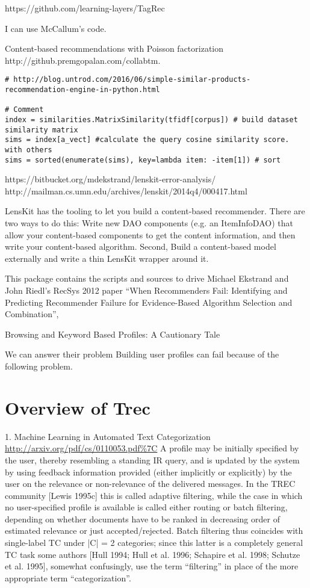 \documentclass[14pt]{article}
\begin{document}
https://github.com/learning-layers/TagRec


I can use McCallum's code.

Content-based recommendations with Poisson factorization
http://github.premgopalan.com/collabtm.



\begin{verbatim}
# http://blog.untrod.com/2016/06/simple-similar-products-recommendation-engine-in-python.html

# Comment
index = similarities.MatrixSimilarity(tfidf[corpus]) # build dataset similarity matrix
sims = index[a_vect] #calculate the query cosine similarity score. with others
sims = sorted(enumerate(sims), key=lambda item: -item[1]) # sort
\end{verbatim}

https://bitbucket.org/mdekstrand/lenskit-error-analysis/
http://mailman.cs.umn.edu/archives/lenskit/2014q4/000417.html

LensKit has the tooling to let you build a content-based recommender. There are
two ways to do this: Write new DAO components (e.g. an ItemInfoDAO) that allow
your content-based components to get the content information, and then write
your content-based algorithm. Second, Build a content-based model externally and
write a thin LensKit wrapper around it.

This package contains the scripts and sources to drive Michael Ekstrand and John
Riedl's RecSys 2012 paper “When Recommenders Fail: Identifying and Predicting
Recommender Failure for Evidence-Based Algorithm Selection and Combination”,




Browsing and Keyword Based Profiles: A Cautionary Tale

We can answer their problem
Building user profiles can fail because of the following problem.

\section{Overview of Trec}
\label{sec:overview-trec}
1. Machine Learning in Automated Text Categorization
\url{http://arxiv.org/pdf/cs/0110053.pdf\%7C}
A profile may be initially specified by the user, thereby resembling a standing
IR query, and is updated by the system by using feedback information provided
(either implicitly or explicitly) by the user on the relevance or non-relevance of the
delivered messages. In the TREC community [Lewis 1995c] this is called adaptive
filtering, while the case in which no user-specified profile is available is called either
routing or batch filtering, depending on whether documents have to be ranked in
decreasing order of estimated relevance or just accepted/rejected. Batch filtering
thus coincides with single-label TC under |C| = 2 categories; since this latter is
a completely general TC task some authors [Hull 1994; Hull et al. 1996; Schapire
et al. 1998; Schutze et al. 1995], somewhat confusingly, use the term “filtering” in
place of the more appropriate term “categorization”.
\end{document}

